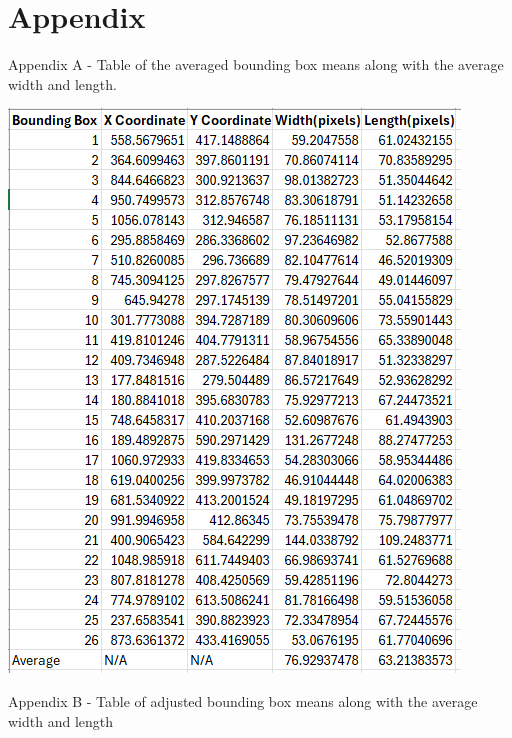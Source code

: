 \documentclass[man]{apa7}
\begin{document}
\newpage

\printbibliography

\newpage
\section{Appendix}

\noindent Appendix A - Table of the averaged bounding box means along with the average width and length.

\begin{minipage}{\linewidth}
  \includegraphics[]{figures/originalMeans.png}
  \label{fig:originalMeans}
\end{minipage}

\newpage

\noindent Appendix B - Table of adjusted bounding box means along with the average width and length
\end{document}
